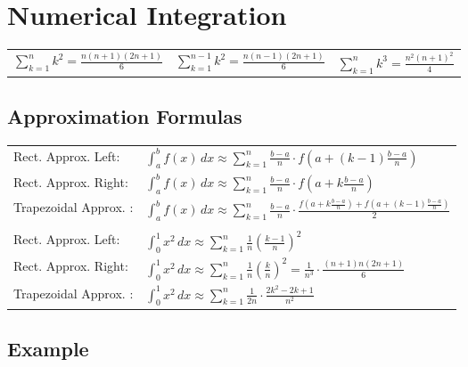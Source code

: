 \section*{Numerical Integration}

\begin{tabular}{p{.333\linewidth}p{.333\linewidth}p{.333\linewidth}}
    $\sum\limits_{k=1}^{n} k^2 = \frac{n\left(n+1\right)\left(2n+1\right)}{6}$ &
    $\sum\limits_{k=1}^{n-1} k^2 = \frac{n\left(n-1\right)\left(2n+1\right)}{6}$ &
    $\sum\limits_{k=1}^{n} k^3 = \frac{n^2\left(n+1\right)^2}{4}$ \\
\end{tabular}

\subsection*{Approximation Formulas}

\begin{tabular}{ll}
    Rect. Approx. Left: &
    $\int_a^b f(x)\,dx \approx \sum\limits_{k=1}^{n} \frac{b-a}{n} \cdot f\left(a+(k-1)\frac{b-a}{n}\right)$ \\
    Rect. Approx. Right: &
    $\int_a^b f(x)\,dx \approx \sum\limits_{k=1}^{n} \frac{b-a}{n} \cdot f\left(a+k\frac{b-a}{n}\right)$ \\
    Trapezoidal Approx. : &
    $\int_a^b f(x)\,dx \approx \sum\limits_{k=1}^{n} \frac{b-a}{n} \cdot \frac{ f\left(a+k\frac{b-a}{n}\right) + f\left(a+(k-1)\frac{b-a}{n}\right) }{2}$ \\
    & \\
    Rect. Approx. Left: &
    $\int_0^1 x^2\,dx \approx \sum\limits_{k=1}^{n} \frac{1}{n}\left(\frac{k-1}{n}\right)^2$ \\
    Rect. Approx. Right: &
    $\int_0^1 x^2\,dx \approx \sum\limits_{k=1}^{n} \frac{1}{n}\left(\frac{k}{n}\right)^2 = \frac{1}{n^3}\cdot\frac{(n+1)n(2n+1)}{6}$ \\
    Trapezoidal Approx. : &
    $\int_0^1 x^2\,dx \approx \sum\limits_{k=1}^{n} \frac{1}{2n}\cdot\frac{2k^2 - 2k + 1}{n^2}$ \\
\end{tabular}

\subsection*{Example}

